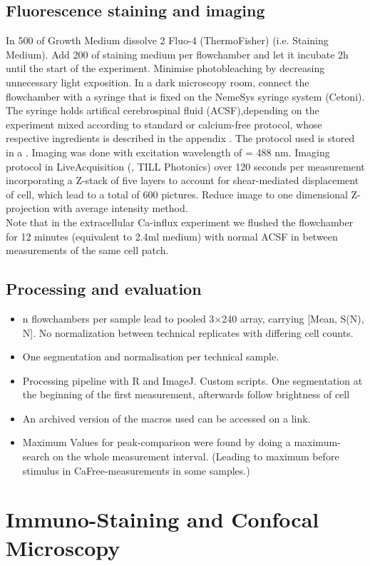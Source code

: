 \subsection{Fluorescence staining and imaging}
In 500\mul{} of Growth Medium dissolve 2\mul{} Fluo-4 (ThermoFisher) (i.e. Staining Medium). Add 200\mul{} of staining medium per flowchamber and let it incubate 2h until the start of the experiment. 
Minimise photobleaching by decreasing unnecessary light exposition. In a dark microscopy room, connect the flowchamber with a syringe that is fixed on the NemeSys syringe system (Cetoni). The syringe holds artifical cerebrospinal fluid (ACSF),depending on the experiment mixed according to standard or calcium-free protocol, whose respective ingredients is described in the appendix . The protocol used is stored in a \myworries{}. Imaging was done with excitation wavelength of \textlambda = 488 nm. Imaging protocol in LiveAcquisition (, TILL Photonics) over 120 seconds per measurement incorporating a Z-stack of five layers to account for shear-mediated displacement of cell, which lead to a total of 600 pictures. Reduce image to one dimensional Z-projection with average intensity method.  \\
Note that in the extracellular Ca-influx experiment we flushed the flowchamber for 12 minutes (equivalent to 2.4ml medium) with normal ACSF in between measurements of the same cell patch.


\subsection{Processing and evaluation}

\begin{itemize}
\item n flowchambers per sample lead to pooled 3$\times$240 array, carrying [Mean, S(N), N]. No normalization between technical replicates with differing cell counts. 
\item One segmentation and normalisation per technical sample.
\item Processing pipeline with R and ImageJ. Custom scripts. One segmentation at the beginning of the first measurement, afterwards follow brightness of cell
\item An archived version of the macros used can be accessed on a link.
\item Maximum Values for peak-comparison were found by doing a maximum-search on the whole measurement interval. (Leading to maximum before stimulus in CaFree-measurements in some samples.)
\end{itemize}


\section{Immuno-Staining and Confocal Microscopy}

